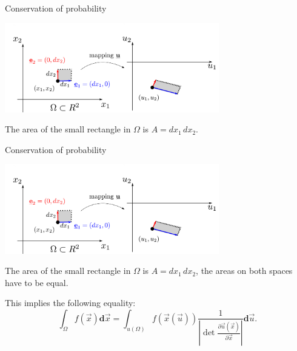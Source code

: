 \begin{frame}{Conservation of probability}

\begin{center}
\includegraphics[width=0.7\textwidth]{img/u}
\end{center}

The area of the small rectangle in $\Omega$ is $A = dx_1\, dx_2$.\\

\end{frame}


\begin{frame}{Conservation of probability}

\begin{center}
\includegraphics[width=0.7\textwidth]{img/u}
\end{center}

The area of the small rectangle in $\Omega$ is $A = dx_1\, dx_2$, the areas on both spaces have to be equal.

\pause

This implies the following equality:
\begin{equation}
\int_{\Omega} f(\vec{x}) \mathbf{d}\vec{x}
=\int_{u(\Omega)} f({\vec x(\vec u)}) \frac{1}{\left|\det \frac{\partial \vec{u}(\vec{x})}{\partial \vec{x}} \right|} \mathbf{d}\vec{u}.
\end{equation}

\end{frame}

